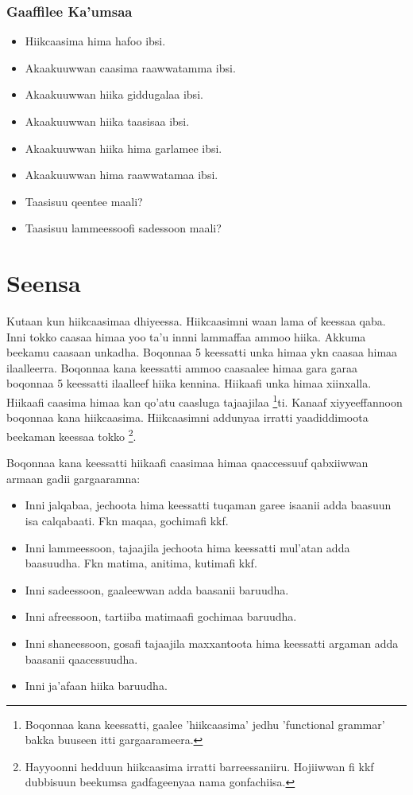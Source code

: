 \documentclass[11pt,b5paper]{book}
\begin{document}
\subsubsection{Gaaffilee Ka'umsaa}
\begin{itemize}
	\item Hiikcaasima hima hafoo ibsi.
	\item Akaakuuwwan caasima raawwatamma ibsi.
	\item Akaakuuwwan hiika giddugalaa ibsi.
	\item Akaakuuwwan hiika taasisaa ibsi.
	\item Akaakuuwwan hiika hima garlamee ibsi.
	\item Akaakuuwwan hima raawwatamaa ibsi. 
	\item Taasisuu qeentee maali?
	\item Taasisuu lammeessoofi sadessoon maali?
\end{itemize}


\section{Seensa}
Kutaan kun hiikcaasimaa dhiyeessa. Hiikcaasimni waan lama of keessaa qaba. Inni tokko caasaa himaa yoo ta'u innni lammaffaa ammoo hiika. Akkuma beekamu caasaan unkadha. Boqonnaa 5 keessatti unka himaa ykn caasaa himaa ilaalleerra. Boqonnaa kana keessatti ammoo caasaalee himaa gara garaa boqonnaa 5 keessatti ilaalleef hiika kennina. Hiikaafi unka himaa xiinxalla. Hiikaafi caasima himaa kan qo'atu caasluga tajaajilaa \footnote{Boqonnaa kana keessatti, gaalee 'hiikcaasima' jedhu 'functional grammar' bakka buuseen itti gargaarameera.}ti. Kanaaf xiyyeeffannoon boqonnaa kana hiikcaasima. Hiikcaasimni addunyaa irratti yaadiddimoota beekaman keessaa tokko \footnote{Hayyoonni hedduun hiikcaasima irratti barreessaniiru. Hojiiwwan \cite{siewierska1984passive,shibatani1985passives,halliday1994introduction,kulikov1993second,mous2001middle,tolemariam2009} fi kkf dubbisuun beekumsa gadfageenyaa nama gonfachiisa.}. 

Boqonnaa kana keessatti hiikaafi caasimaa himaa qaaccessuuf qabxiiwwan armaan gadii gargaaramna:\\
\begin{itemize}
	\item Inni jalqabaa, jechoota hima keessatti tuqaman garee isaanii adda baasuun isa calqabaati. Fkn maqaa, gochimafi kkf. 
	\item Inni lammeessoon, tajaajila jechoota hima keessatti mul’atan adda baasuudha. Fkn matima, anitima, kutimafi kkf.
	\item Inni sadeessoon, gaaleewwan adda baasanii baruudha. 
	\item Inni afreessoon, tartiiba matimaafi gochimaa baruudha.
	\item Inni shaneessoon, gosafi tajaajila maxxantoota hima keessatti argaman adda baasanii qaacessuudha.
	\item Inni ja'afaan hiika baruudha.
	
\end{itemize}
\end{document}
